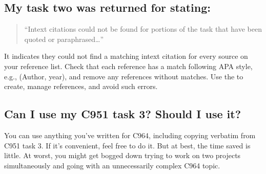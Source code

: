 \documentclass[letterpaper,10pt,english]{jupyterBook}
\begin{document}
\subsection{My task two was returned for  stating:}
\label{\detokenize{task2_doc/task2_doc:my-task-two-was-returned-for-sources-stating}}\begin{quote}

\sphinxAtStartPar
“In\sphinxhyphen{}text citations could not be found for portions of the task that have been quoted or paraphrased…”
\end{quote}

\sphinxAtStartPar
{}

\sphinxAtStartPar
It indicates they could not find a matching in\sphinxhyphen{}text citation for every source on your reference list. Check that each reference has a match following APA style, e.g., (Author, year), and remove any references without matches. Use the  to create, manage references, and avoid such errors.


\subsection{Can I use my C951 task 3? Should I use it?}
\label{\detokenize{task2_doc/task2_doc:can-i-use-my-c951-task-3-should-i-use-it}}
\sphinxAtStartPar
You can use anything you’ve written for C964, including copying verbatim from C951 task 3. If it’s convenient, feel free to do it. But at best, the time saved is little. At worst, you might get bogged down trying to work on two projects simultaneously and going with an unnecessarily complex C964 topic.
\end{document}
